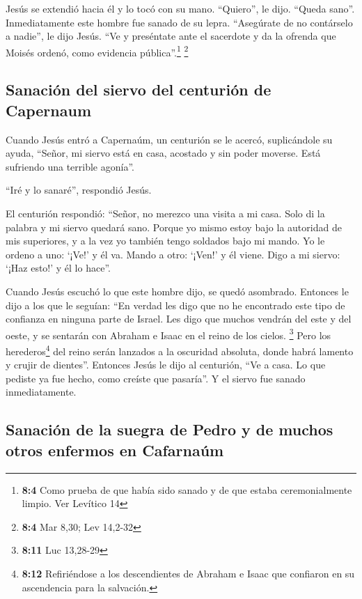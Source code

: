  Jesús se extendió hacia él y lo tocó con su mano.
``Quiero'', le dijo. ``Queda sano''. Inmediatamente este hombre fue
sanado de su lepra.  ``Asegúrate de no contárselo a
nadie'', le dijo Jesús. ``Ve y preséntate ante el sacerdote y da la
ofrenda que Moisés ordenó, como evidencia pública''.\footnote{\textbf{8:4}
  Como prueba de que había sido sanado y de que estaba ceremonialmente
  limpio. Ver Levítico 14} \footnote{\textbf{8:4} Mar 8,30; Lev 14,2-32}

\hypertarget{sanaciuxf3n-del-siervo-del-centuriuxf3n-de-capernaum}{%
\subsection{Sanación del siervo del centurión de
Capernaum}\label{sanaciuxf3n-del-siervo-del-centuriuxf3n-de-capernaum}}

 Cuando Jesús entró a Capernaúm, un centurión se le
acercó, suplicándole su ayuda,  ``Señor, mi siervo está en
casa, acostado y sin poder moverse. Está sufriendo una terrible
agonía''.

 ``Iré y lo sanaré'', respondió Jesús.

 El centurión respondió: ``Señor, no merezco una visita a
mi casa. Solo di la palabra y mi siervo quedará sano. 
Porque yo mismo estoy bajo la autoridad de mis superiores, y a la vez yo
también tengo soldados bajo mi mando. Yo le ordeno a uno: `¡Ve!' y él
va. Mando a otro: `¡Ven!' y él viene. Digo a mi siervo: `¡Haz esto!' y
él lo hace''.

 Cuando Jesús escuchó lo que este hombre dijo, se quedó
asombrado. Entonces le dijo a los que le seguían: ``En verdad les digo
que no he encontrado este tipo de confianza en ninguna parte de Israel.
 Les digo que muchos vendrán del este y del oeste, y se
sentarán con Abraham e Isaac en el reino de los cielos. \footnote{\textbf{8:11}
  Luc 13,28-29}  Pero los herederos\footnote{\textbf{8:12}
  Refiriéndose a los descendientes de Abraham e Isaac que confiaron en
  su ascendencia para la salvación.} del reino serán lanzados a la
oscuridad absoluta, donde habrá lamento y crujir de dientes''.
 Entonces Jesús le dijo al centurión, ``Ve a casa. Lo que
pediste ya fue hecho, como creíste que pasaría''. Y el siervo fue sanado
inmediatamente.

\hypertarget{sanaciuxf3n-de-la-suegra-de-pedro-y-de-muchos-otros-enfermos-en-cafarnauxfam}{%
\subsection{Sanación de la suegra de Pedro y de muchos otros enfermos en
Cafarnaúm}\label{sanaciuxf3n-de-la-suegra-de-pedro-y-de-muchos-otros-enfermos-en-cafarnauxfam}}

